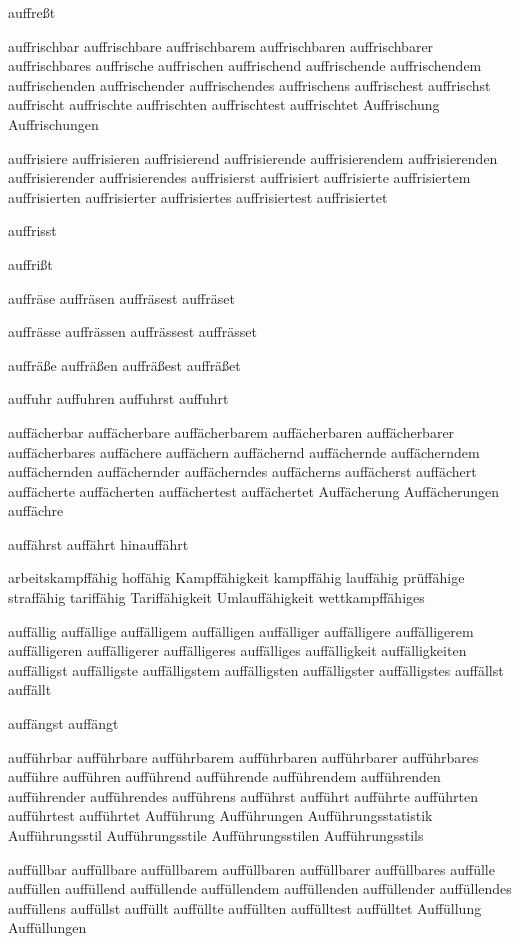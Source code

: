 auffreßt

auffrischbar auffrischbare auffrischbarem auffrischbaren auffrischbarer auffrischbares auffrische auffrischen auffrischend auffrischende auffrischendem auffrischenden auffrischender auffrischendes auffrischens auffrischest auffrischst auffrischt auffrischte auffrischten auffrischtest auffrischtet Auffrischung Auffrischungen

auffrisiere auffrisieren auffrisierend auffrisierende auffrisierendem auffrisierenden auffrisierender auffrisierendes auffrisierst auffrisiert auffrisierte auffrisiertem auffrisierten auffrisierter auffrisiertes auffrisiertest auffrisiertet

auffrisst

auffrißt

auffräse auffräsen auffräsest auffräset

auffrässe auffrässen auffrässest auffrässet

auffräße auffräßen auffräßest auffräßet

auffuhr auffuhren auffuhrst auffuhrt

auffächerbar auffächerbare auffächerbarem auffächerbaren auffächerbarer auffächerbares auffächere auffächern auffächernd auffächernde auffächerndem auffächernden auffächernder auffächerndes auffächerns auffächerst auffächert auffächerte auffächerten auffächertest auffächertet Auffächerung Auffächerungen auffächre

auffährst auffährt hinauffährt

arbeitskampffähig hoffähig Kampffähigkeit kampffähig lauffähig  prüffähige straffähig tariffähig Tariffähigkeit Umlauffähigkeit wettkampffähiges

auffällig auffällige auffälligem auffälligen auffälliger auffälligere auffälligerem auffälligeren auffälligerer auffälligeres auffälliges auffälligkeit auffälligkeiten auffälligst auffälligste auffälligstem auffälligsten auffälligster auffälligstes auffällst auffällt

auffängst auffängt

aufführbar aufführbare aufführbarem aufführbaren aufführbarer aufführbares aufführe aufführen aufführend aufführende aufführendem aufführenden aufführender aufführendes aufführens aufführst aufführt aufführte aufführten aufführtest aufführtet Aufführung Aufführungen Aufführungsstatistik Aufführungsstil Aufführungsstile Aufführungsstilen Aufführungsstils

auffüllbar auffüllbare auffüllbarem auffüllbaren auffüllbarer auffüllbares auffülle auffüllen auffüllend auffüllende auffüllendem auffüllenden auffüllender auffüllendes auffüllens auffüllst auffüllt auffüllte auffüllten auffülltest auffülltet Auffüllung Auffüllungen

